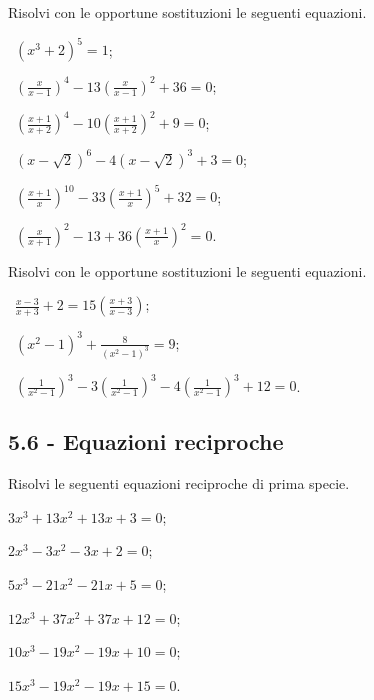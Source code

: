 \begin{esercizio}
 \label{ese:5.36}
Risolvi con le opportune sostituzioni le seguenti equazioni.
\begin{multicols}{2}
 \begin{enumeratea}
 \item~$ (x^3+2)^5=1 $;
 \item~$ \left(\frac x{x-1}\right)^4-13\left(\frac x{x-1}\right)^2+36=0 $;
 \item~$ \left(\frac{x+1}{x+2}\right)^4-10\left(\frac{x+1}{x+2}\right)^2+9=0 $;
 \item~$ \left(x-\sqrt 2\right)^6-4\left(x-\sqrt 2\right)^3+3=0 $;
 \item~$ \left(\frac{x+1} x\right)^{10}-33\left(\frac{x+1} x\right)^5+32=0 $;
 \item~$ \left(\frac x{x+1}\right)^2-13+36\left(\frac{x+1} x\right)^2=0 $.
 \end{enumeratea}
\end{multicols}
\end{esercizio}

\begin{esercizio}
\label{ese:5.37}
Risolvi con le opportune sostituzioni le seguenti equazioni.
 \begin{enumeratea}
 \item~$ \frac{x-3}{x+3}+2=15\left(\frac{x+3}{x-3}\right) $;
 \item~$ \left(x^2-1\right)^3+\frac 8{\left(x^2-1\right)^3}=9 $;
 \item~$ \left(\frac 1{x^2-1}\right)^3-3\left(\frac 1{x^2-1}\right)^3-4\left(\frac 1{x^2-1}\right)^3+12=0 $.
 \end{enumeratea}
\end{esercizio}

\subsection*{5.6 - Equazioni reciproche}

\begin{esercizio}[\Ast]
\label{ese:5.38}
Risolvi le seguenti equazioni reciproche di prima specie.
\begin{multicols}{2}
\begin{enumeratea}
\item $3x^3+13x^2+13x+3=0$;
\item $2x^3-3x^2-3x+2=0$;
\item $5x^3-21x^2-21x+5=0$;
\item $12x^3+37x^2+37x+12=0$;
\item $10x^3-19x^2-19x+10=0$;
\item $15x^3-19x^2-19x+15=0$.
\end{enumeratea}
\end{multicols}
\end{esercizio}

